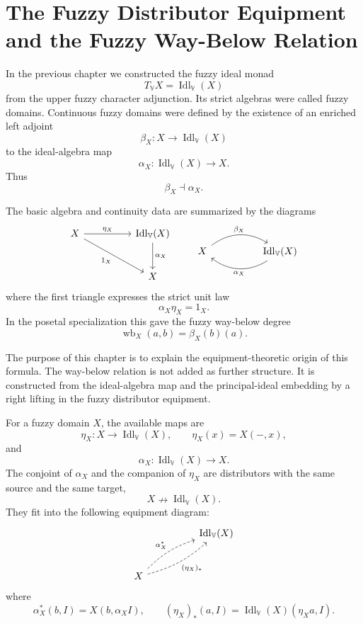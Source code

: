 \chapter{The Fuzzy Distributor Equipment and the Fuzzy Way-Below Relation}
\label{ch:fuzzy-distributors-way-below}

In the previous chapter we constructed the fuzzy ideal monad
\[
    T_{\mathbb V}X
    =
    \operatorname{Idl}_{\mathbb V}(X)
\]
from the upper fuzzy character adjunction. Its strict algebras were called fuzzy
domains. Continuous fuzzy domains were defined by the existence of an enriched
left adjoint
\[
    \beta_X:X\to \operatorname{Idl}_{\mathbb V}(X)
\]
to the ideal-algebra map
\[
    \alpha_X:\operatorname{Idl}_{\mathbb V}(X)\to X.
\]
Thus
\[
    \beta_X\dashv \alpha_X.
\]

The basic algebra and continuity data are summarized by the diagrams
\[
\begin{tikzcd}[column sep=huge,row sep=large]
X
    \ar[r,"\eta_X"]
    \ar[dr,"1_X"']
&
\operatorname{Idl}_{\mathbb V}(X)
    \ar[d,"\alpha_X"]
\\
&
X
\end{tikzcd}
\qquad
\begin{tikzcd}[column sep=huge,row sep=large]
X
    \ar[r,bend left=35,"\beta_X"]
&
\operatorname{Idl}_{\mathbb V}(X)
    \ar[l,bend left=35,"\alpha_X"]
\end{tikzcd}
\]
where the first triangle expresses the strict unit law
\[
    \alpha_X\eta_X=1_X.
\]
In the posetal specialization this gave the fuzzy way-below degree
\[
    \operatorname{wb}_X(a,b)=\beta_X(b)(a).
\]

The purpose of this chapter is to explain the equipment-theoretic origin of this
formula. The way-below relation is not added as further structure. It is
constructed from the ideal-algebra map and the principal-ideal embedding by a
right lifting in the fuzzy distributor equipment.

For a fuzzy domain \(X\), the available maps are
\[
    \eta_X:X\to \operatorname{Idl}_{\mathbb V}(X),
    \qquad
    \eta_X(x)=X(-,x),
\]
and
\[
    \alpha_X:\operatorname{Idl}_{\mathbb V}(X)\to X.
\]
The conjoint of \(\alpha_X\) and the companion of \(\eta_X\) are distributors
with the same source and the same target,
\[
    X\nrightarrow \operatorname{Idl}_{\mathbb V}(X).
\]
They fit into the following equipment diagram:
\[
\begin{tikzcd}[column sep=huge,row sep=large]
&
\operatorname{Idl}_{\mathbb V}(X)
\\
X
    \ar[ur,dashed,bend left=13,"\alpha_X^\ast"]
    \ar[ur,dashed,bend right=13,"{(\eta_X)_\ast}"']
\end{tikzcd}
\]
where
\[
    \alpha_X^\ast(b,I)=X(b,\alpha_X I),
    \qquad
    (\eta_X)_\ast(a,I)
    =
    \operatorname{Idl}_{\mathbb V}(X)(\eta_X a,I).
\]

